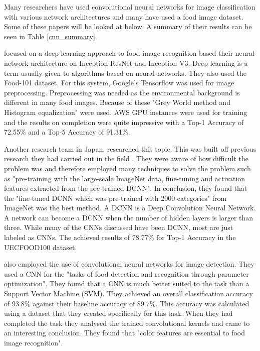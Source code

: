 Many researchers have used convolutional neural networks for image
classification with various network architectures and many have used a food image dataset.
Some of these papers will be looked at below.
A summary of their results can be seen in Table \ref{cnn_summary}.

\textcite{deepLearning} focused on a deep learning approach to food image recognition based
their neural network architecture on Inception-ResNet and Inception V3.
Deep learning is a term usually given to algorithms based on neural networks.
They also used the Food-101 dataset. For this system, Google's
Tensorflow was used for image preprocessing. Preprocessing was needed as the
environmental background is different in many food images. Because of these
"Grey World method and Histogram equalization" \textcite{deepLearning} were
used.
AWS GPU instances were used for training and the results on completion were
quite impressive with a Top-1 Accuracy of 72.55\% and a Top-5 Accuracy of
91.31\%.


Another research team in Japan, \textcite{yanaiFood} researched this topic. This was built off previous research they had carried out in the field \textcite{kawano2014food}.
They were aware of how
difficult the problem was and therefore employed many techniques to solve the
problem such as "pre-training with the large-scale ImageNet data, fine-tuning
and activation features extracted from the pre-trained DCNN". 
In conclusion, they found that the "fine-tuned DCNN which was pre-trained
with 2000 categories" from ImageNet was the best method. A
DCNN is a Deep Convolution Neural Network. 
A network can become a DCNN when the number of hidden layers is larger than three.
While many of the CNNs discussed have been DCNN, most are just labeled as CNNs.
The achieved results of 78.77\% for Top-1 Accuracy in the UECFOOD100 dataset.


\textcite{kagayaFood} also employed the use of convolutional neural networks for
image detection. They used a CNN for the "tasks of food detection and recognition
through parameter optimization".
They found that a CNN is much better suited to the task than a Support Vector
Machine (SVM). They achieved an overall classification accuracy of 93.8\%
against their baseline accuracy of 89.7\%. This accuracy
was calculated using a dataset that they created specifically for this task.
When they had completed the task they analysed the trained convolutional kernels
and came to an interesting conclusion. They found that "color features are
essential to food image recognition".


